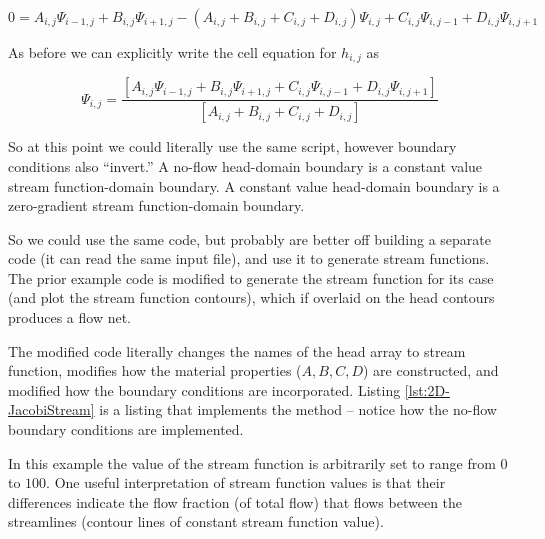 \begin{equation}
0 = A_{i,j}\Psi_{i-1,j} + B_{i,j}\Psi_{i+1,j} - (A_{i,j}+B_{i,j}+C_{i,j}+D_{i,j})\Psi_{i,j} + C_{i,j}\Psi_{i,j-1} + D_{i,j}\Psi_{i,j+1}
\end{equation}

As before we can explicitly write the cell equation for $h_{i,j}$ as

\begin{equation}
\Psi_{i,j} = \frac{[A_{i,j}\Psi_{i-1,j} + B_{i,j}\Psi_{i+1,j} + C_{i,j}\Psi_{i,j-1} + D_{i,j}\Psi_{i,j+1}]}{[A_{i,j}+B_{i,j}+C_{i,j}+D_{i,j}]}
\end{equation}

So at this point we could literally use the same script, however boundary conditions also ``invert.''
A no-flow head-domain boundary is a constant value stream function-domain boundary.
A constant value head-domain boundary is a zero-gradient stream function-domain boundary.

So we could use the same code, but probably are better off building a separate code (it can read the same input file), and use it to generate stream functions.  
The prior example code is modified to generate the stream function for its case (and plot the stream function contours), which if overlaid on the head contours produces a flow net.

The modified code literally changes the names of the head array to stream function, modifies how the material properties ($A,B,C,D$) are constructed, and modified how the boundary conditions are incorporated.  Listing \ref{lst:2D-JacobiStream} is a listing that implements the method -- notice how the no-flow boundary conditions are implemented.   

In this example the value of the stream function is arbitrarily set to range from $0$ to $100$.  One useful interpretation of stream function values is that their differences indicate the flow fraction (of total flow) that flows between the streamlines (contour lines of constant stream function value).
\clearpage


